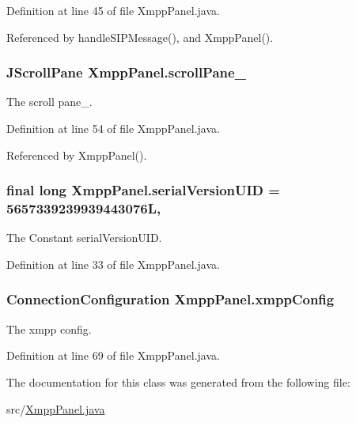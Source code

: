 Definition at line 45 of file Xmpp\-Panel.\-java.



Referenced by handle\-S\-I\-P\-Message(), and Xmpp\-Panel().

\hypertarget{class_xmpp_panel_abbce5c6df3319cb78e4d960d8797e693}{
\subsubsection[{scroll\-Pane\-\_\-2}]{\setlength{\rightskip}{0pt plus 5cm}J\-Scroll\-Pane Xmpp\-Panel.\-scroll\-Pane\-\_\hspace{0.3cm}{\ttfamily [private]}}}\label{class_xmpp_panel_abbce5c6df3319cb78e4d960d8797e693}
The scroll pane\-\_. 

Definition at line 54 of file Xmpp\-Panel.\-java.



Referenced by Xmpp\-Panel().

\hypertarget{class_xmpp_panel_afc08a42a1003eef8822e0cecf2eedaeb}{
\subsubsection[{serial\-Version\-U\-I\-D}]{\setlength{\rightskip}{0pt plus 5cm}final long Xmpp\-Panel.\-serial\-Version\-U\-I\-D = 5657339239939443076\-L\hspace{0.3cm}{\ttfamily [static]}, {\ttfamily [private]}}}\label{class_xmpp_panel_afc08a42a1003eef8822e0cecf2eedaeb}
The Constant serial\-Version\-U\-I\-D. 

Definition at line 33 of file Xmpp\-Panel.\-java.

\hypertarget{class_xmpp_panel_a65e1f37487a3e74772abe12930f820ad}{
\subsubsection[{xmpp\-Config}]{\setlength{\rightskip}{0pt plus 5cm}Connection\-Configuration Xmpp\-Panel.\-xmpp\-Config\hspace{0.3cm}{\ttfamily [private]}}}\label{class_xmpp_panel_a65e1f37487a3e74772abe12930f820ad}
The xmpp config. 

Definition at line 69 of file Xmpp\-Panel.\-java.



The documentation for this class was generated from the following file\-:\begin{DoxyCompactItemize}
\item 
src/\hyperlink{_xmpp_panel_8java}{Xmpp\-Panel.\-java}\end{DoxyCompactItemize}
